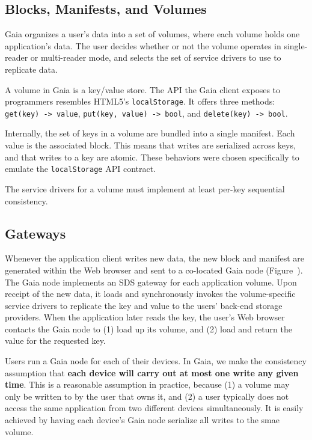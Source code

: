 \subsection{Blocks, Manifests, and Volumes}

Gaia organizes a user's data into a set of volumes, where each volume
holds one application's data.  The user decides whether or not the volume
operates in single-reader or multi-reader mode, and selects the set of
service drivers to use to replicate data.

A volume in Gaia is a key/value store.  The API the Gaia client exposes to
programmers resembles HTML5's \texttt{localStorage}.  It offers three methods:
\texttt{get(key) -> value}, \texttt{put(key, value) -> bool}, and
\texttt{delete(key) -> bool}.

Internally, the set of keys in a volume are bundled into a single manifest.
Each value is the associated block.  This means that writes are serialized
across keys, and that writes to a key are atomic.  These behaviors were chosen
specifically to emulate the \texttt{localStorage} API contract.

The service drivers for a volume must implement at least per-key sequential
consistency.

\subsection{Gateways}


Whenever the application client writes new data, the new block and manifest are
generated within the Web browser and sent to a co-located Gaia node
(Figure~).  The Gaia node implements an SDS gateway for
each application volume.  Upon receipt of the new data, it loads and
synchronously invokes the volume-specific service drivers to replicate the key
and value to the users' back-end storage providers.  When the application later
reads the key, the user's Web browser contacts the Gaia node to (1) load up its
volume, and (2) load and return the value for the requested key.

Users run a Gaia node for each of their devices.
In Gaia, we make the consistency assumption that \textbf{each device will
carry out at most one write any given time}.  This is a reasonable
assumption in practice, because (1) a volume may only be written to by the user
that owns it, and (2) a user typically does not access the same application from
two different devices simultaneously.  It is easily achieved by having each
device's Gaia node serialize all writes to the smae volume.

